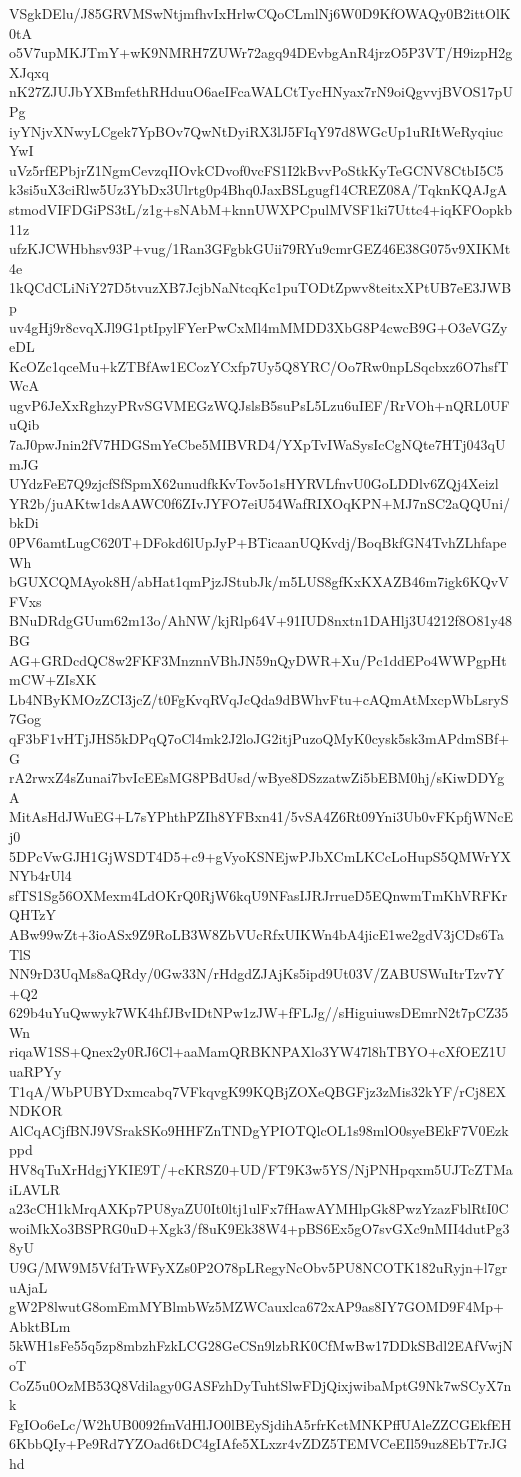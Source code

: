 VSgkDElu/J85GRVMSwNtjmfhvIxHrlwCQoCLmlNj6W0D9KfOWAQy0B2ittOlK0tA
o5V7upMKJTmY+wK9NMRH7ZUWr72agq94DEvbgAnR4jrzO5P3VT/H9izpH2gXJqxq
nK27ZJUJbYXBmfethRHduuO6aeIFcaWALCtTycHNyax7rN9oiQgvvjBVOS17pUPg
iyYNjvXNwyLCgek7YpBOv7QwNtDyiRX3lJ5FIqY97d8WGcUp1uRItWeRyqiucYwI
uVz5rfEPbjrZ1NgmCevzqIIOvkCDvof0vcFS1I2kBvvPoStkKyTeGCNV8CtbI5C5
k3si5uX3ciRlw5Uz3YbDx3Ulrtg0p4Bhq0JaxBSLgugf14CREZ08A/TqknKQAJgA
stmodVIFDGiPS3tL/z1g+sNAbM+knnUWXPCpulMVSF1ki7Uttc4+iqKFOopkb11z
ufzKJCWHbhsv93P+vug/1Ran3GFgbkGUii79RYu9cmrGEZ46E38G075v9XIKMt4e
1kQCdCLiNiY27D5tvuzXB7JcjbNaNtcqKc1puTODtZpwv8teitxXPtUB7eE3JWBp
uv4gHj9r8cvqXJl9G1ptIpylFYerPwCxMl4mMMDD3XbG8P4cwcB9G+O3eVGZyeDL
KcOZc1qceMu+kZTBfAw1ECozYCxfp7Uy5Q8YRC/Oo7Rw0npLSqcbxz6O7hsfTWcA
ugvP6JeXxRghzyPRvSGVMEGzWQJslsB5suPsL5Lzu6uIEF/RrVOh+nQRL0UFuQib
7aJ0pwJnin2fV7HDGSmYeCbe5MIBVRD4/YXpTvIWaSysIcCgNQte7HTj043qUmJG
UYdzFeE7Q9zjcfSfSpmX62unudfkKvTov5o1sHYRVLfnvU0GoLDDlv6ZQj4Xeizl
YR2b/juAKtw1dsAAWC0f6ZIvJYFO7eiU54WafRIXOqKPN+MJ7nSC2aQQUni/bkDi
0PV6amtLugC620T+DFokd6lUpJyP+BTicaanUQKvdj/BoqBkfGN4TvhZLhfapeWh
bGUXCQMAyok8H/abHat1qmPjzJStubJk/m5LUS8gfKxKXAZB46m7igk6KQvVFVxs
BNuDRdgGUum62m13o/AhNW/kjRlp64V+91IUD8nxtn1DAHlj3U4212f8O81y48BG
AG+GRDcdQC8w2FKF3MnznnVBhJN59nQyDWR+Xu/Pc1ddEPo4WWPgpHtmCW+ZIsXK
Lb4NByKMOzZCI3jcZ/t0FgKvqRVqJcQda9dBWhvFtu+cAQmAtMxcpWbLsryS7Gog
qF3bF1vHTjJHS5kDPqQ7oCl4mk2J2loJG2itjPuzoQMyK0cysk5sk3mAPdmSBf+G
rA2rwxZ4sZunai7bvIcEEsMG8PBdUsd/wBye8DSzzatwZi5bEBM0hj/sKiwDDYgA
MitAsHdJWuEG+L7sYPhthPZIh8YFBxn41/5vSA4Z6Rt09Yni3Ub0vFKpfjWNcEj0
5DPcVwGJH1GjWSDT4D5+c9+gVyoKSNEjwPJbXCmLKCcLoHupS5QMWrYXNYb4rUl4
sfTS1Sg56OXMexm4LdOKrQ0RjW6kqU9NFasIJRJrrueD5EQnwmTmKhVRFKrQHTzY
ABw99wZt+3ioASx9Z9RoLB3W8ZbVUcRfxUIKWn4bA4jicE1we2gdV3jCDs6TaTlS
NN9rD3UqMs8aQRdy/0Gw33N/rHdgdZJAjKs5ipd9Ut03V/ZABUSWuItrTzv7Y+Q2
629b4uYuQwwyk7WK4hfJBvIDtNPw1zJW+fFLJg//sHiguiuwsDEmrN2t7pCZ35Wn
riqaW1SS+Qnex2y0RJ6Cl+aaMamQRBKNPAXlo3YW47l8hTBYO+cXfOEZ1UuaRPYy
T1qA/WbPUBYDxmcabq7VFkqvgK99KQBjZOXeQBGFjz3zMis32kYF/rCj8EXNDKOR
AlCqACjfBNJ9VSrakSKo9HHFZnTNDgYPIOTQlcOL1s98mlO0syeBEkF7V0Ezkppd
HV8qTuXrHdgjYKIE9T/+cKRSZ0+UD/FT9K3w5YS/NjPNHpqxm5UJTcZTMaiLAVLR
a23cCH1kMrqAXKp7PU8yaZU0It0ltj1ulFx7fHawAYMHlpGk8PwzYzazFblRtI0C
woiMkXo3BSPRG0uD+Xgk3/f8uK9Ek38W4+pBS6Ex5gO7svGXc9nMII4dutPg38yU
U9G/MW9M5VfdTrWFyXZs0P2O78pLRegyNcObv5PU8NCOTK182uRyjn+l7gruAjaL
gW2P8lwutG8omEmMYBlmbWz5MZWCauxlca672xAP9as8IY7GOMD9F4Mp+AbktBLm
5kWH1sFe55q5zp8mbzhFzkLCG28GeCSn9lzbRK0CfMwBw17DDkSBdl2EAfVwjNoT
CoZ5u0OzMB53Q8Vdilagy0GASFzhDyTuhtSlwFDjQixjwibaMptG9Nk7wSCyX7nk
FgIOo6eLc/W2hUB0092fmVdHlJO0lBEySjdihA5rfrKctMNKPffUAleZZCGEkfEH
6KbbQIy+Pe9Rd7YZOad6tDC4gIAfe5XLxzr4vZDZ5TEMVCeEIl59uz8EbT7rJGhd

